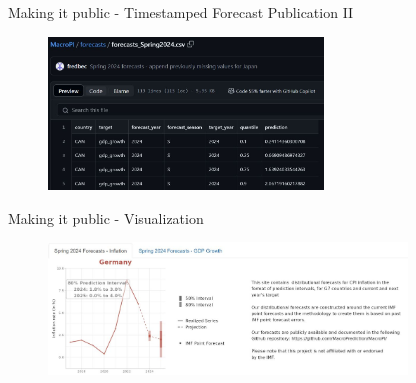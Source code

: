 \documentclass[en]{sdqbeamer}
\begin{document}
\begin{frame}{Making it public - Timestamped Forecast Publication II}

    \begin{figure}
        \includegraphics[width=0.65\textwidth]{figures/Capture_GitHubforecasts.jpg}
        \label{fig:enter-label}
    \end{figure}   

\end{frame}

\begin{frame}{Making it public - Visualization}

    \begin{figure}
        \includegraphics[width=0.85\textwidth]{figures/shinycap_enlarged.jpg}
        \label{fig:enter-label}
    \end{figure}   

\end{frame}


\end{document}
